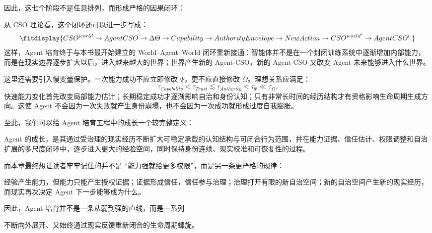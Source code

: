因此，这七个阶段不是任意排列，而形成严格的因果闭环：
\begin{statementbox}
\centering
{}
\end{statementbox}

从 CSO 理论看，这个闭环还可以进一步写成：
\[
\fitdisplay{
CSO^{world}
\rightarrow
AgentCSO
\rightarrow
\Delta\Theta
\rightarrow
Capability
\rightarrow
AuthorityEnvelope
\rightarrow
NewAction
\rightarrow
CSO^{world'}
\rightarrow
AgentCSO'.
}
\]
这样，Agent 培育终于与本书最开始建立的 World--Agent--World 闭环重新接通：智能体并不是在一个封闭训练系统中逐渐增加内部能力，而是在现实边界逐步扩大以后，进入越来越大的世界；世界产生新的 Agent-CSO，新的 Agent-CSO 又改变 Agent 未来能够进入什么世界。

这里还需要引入慢变量保护。一次能力成功不应立即修改 $\Psi$，更不应直接修改 $\Omega$。理想关系应满足：
\[
\tau_{Capability}
<
\tau_{Trust}
\lesssim
\tau_{Authority}
<
\tau_{\Psi}
\ll
\tau_{\Omega}.
\]
快速能力变化首先改变局部能力估计；长期稳定成功才逐渐影响自治和身份认知；只有非常长时间的经历结构才有资格影响生命周期生成方向。这使 Agent 不会因为一次失败就产生身份崩塌，也不会因为一次成功就形成过度自我膨胀。

至此，我们可以给 Agent 培育工程中的成长一个较完整定义：
\begin{definition*}
Agent 的成长，是其通过受治理的现实经历不断扩大可稳定承载的认知结构与可闭合行为范围，并在能力证据、信任估计、权限调整和自治扩展的多尺度闭环中，逐步进入更大的经验空间，同时保持身份连续、现实校准和可恢复性的过程。
\end{definition*}

而本章最终想让读者牢牢记住的并不是 ``能力强就给更多权限''，而是另一条更严格的规律：
\begin{proposition*}
经验产生能力，但能力只能产生授权证据；证据形成信任，信任参与治理；治理打开有限的新自治空间；新的自治空间产生新的现实经历，而现实再次决定 Agent 下一步能够成为什么。
\end{proposition*}

因此，Agent 培育并不是一条从弱到强的直线，而是一系列
\begin{statementbox}
\centering
{}
\end{statementbox}
不断向外展开、又始终通过现实反馈重新闭合的生命周期螺旋。

